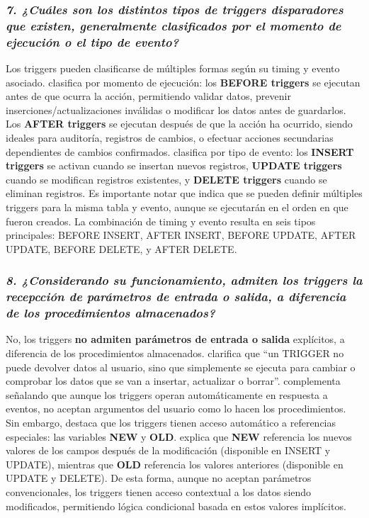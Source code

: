 \subsubsection*{\textit{7. ¿Cuáles son los distintos tipos de triggers disparadores que existen, generalmente clasificados por el momento de ejecución o el tipo de evento?}}

Los triggers pueden clasificarse de múltiples formas según su timing y evento asociado. \parencite{Bosco2020} clasifica por momento de ejecución: los \textbf{BEFORE triggers} se ejecutan antes de que ocurra la acción, permitiendo validar datos, prevenir inserciones/actualizaciones inválidas o modificar los datos antes de guardarlos. Los \textbf{AFTER triggers} se ejecutan después de que la acción ha ocurrido, siendo ideales para auditoría, registros de cambios, o efectuar acciones secundarias dependientes de cambios confirmados. \parencite{Walther2023} clasifica por tipo de evento: los \textbf{INSERT triggers} se activan cuando se insertan nuevos registros, \textbf{UPDATE triggers} cuando se modifican registros existentes, y \textbf{DELETE triggers} cuando se eliminan registros. Es importante notar que \parencite{MySQLDocumentation} indica que se pueden definir múltiples triggers para la misma tabla y evento, aunque se ejecutarán en el orden en que fueron creados. La combinación de timing y evento resulta en seis tipos principales: BEFORE INSERT, AFTER INSERT, BEFORE UPDATE, AFTER UPDATE, BEFORE DELETE, y AFTER DELETE.

\subsubsection*{\textit{8. ¿Considerando su funcionamiento, admiten los triggers la recepcción de parámetros de entrada o salida, a diferencia de los procedimientos almacenados?}}

No, los triggers \textbf{no admiten parámetros de entrada o salida} explícitos, a diferencia de los procedimientos almacenados. \parencite{Bosco2020} clarifica que ``un TRIGGER no puede devolver datos al usuario, sino que simplemente se ejecuta para cambiar o comprobar los datos que se van a insertar, actualizar o borrar''. \parencite{Celaya} complementa señalando que aunque los triggers operan automáticamente en respuesta a eventos, no aceptan argumentos del usuario como lo hacen los procedimientos. Sin embargo, \parencite{MySQLDocumentation} destaca que los triggers tienen acceso automático a referencias especiales: las variables \textbf{NEW} y \textbf{OLD}. \parencite{Bosco2020} explica que \textbf{NEW} referencia los nuevos valores de los campos después de la modificación (disponible en INSERT y UPDATE), mientras que \textbf{OLD} referencia los valores anteriores (disponible en UPDATE y DELETE). De esta forma, aunque no aceptan parámetros convencionales, los triggers tienen acceso contextual a los datos siendo modificados, permitiendo lógica condicional basada en estos valores implícitos.

